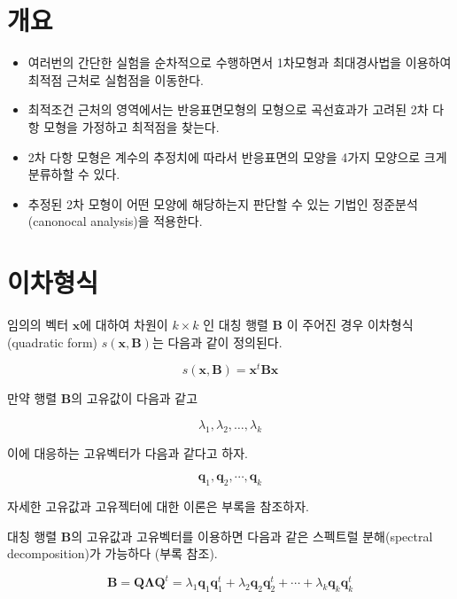 \documentclass[
]{book}
\newcommand{\bm}[1]{\boldsymbol{\mathbf{#1}}}
\theoremstyle{definition}
\theoremstyle{definition}
\theoremstyle{definition}
\theoremstyle{definition}
\theoremstyle{remark}
\begin{document}
\hypertarget{uxac1cuxc694-2}{%
\section{개요}\label{uxac1cuxc694-2}}

\begin{itemize}
\item
  여러번의 간단한 실험을 순차적으로 수행하면서 1차모형과 최대경사법을 이용하여 최적점 근처로 실험점을 이동한다.
\item
  최적조건 근처의 영역에서는 반응표면모형의 모형으로 곡선효과가 고려된 2차 다항 모형을 가정하고 최적점을 찾는다.
\item
  2차 다항 모형은 계수의 추정치에 따라서 반응표면의 모양을 4가지 모양으로 크게 분류하할 수 있다.
\item
  추정된 2차 모형이 어떤 모양에 해당하는지 판단할 수 있는 기법인 정준분석(canonocal analysis)을 적용한다.
\end{itemize}

\hypertarget{uxc774uxcc28uxd615uxc2dd}{%
\section{이차형식}\label{uxc774uxcc28uxd615uxc2dd}}

임의의 벡터 \(\bm x\)에 대하여 차원이 \(k \times k\) 인 대칭 행렬 \(\bm B\) 이 주어진 경우 이차형식(quadratic form) \(s(\bm x, \bm B)\)는 다음과 같이 정의된다.

\begin{equation}
s(\bm x, \bm B) = {\bm x}^t \bm B \bm x 
\label{eq:quadform}
\end{equation}

만약 행렬 \(\bm B\)의 고유값이 다음과 같고

\[ \lambda_1 ,\lambda_2 , \dots , \lambda_k \]

이에 대응하는 고유벡터가 다음과 같다고 하자.

\[  \bm q_1, \bm q_2 , \cdots , \bm q_k \]

자세한 고유값과 고유젝터에 대한 이론은 부록을 참조하자.

대칭 행렬 \(\bm B\)의 고유값과 고유벡터를 이용하면 다음과 같은 스펙트럴 분해(spectral decomposition)가 가능하다 (부록 참조).

\begin{equation}
\bm B = \bm Q \bm \Lambda {\bm Q}^t = \lambda_1 \bm q_1 \bm q_1^t + \lambda_2 \bm q_2 \bm q_2^t 
+ \cdots + \lambda_k \bm q_k \bm q_k^t
\label{eq:specdecomp}
\end{equation}
\end{document}
